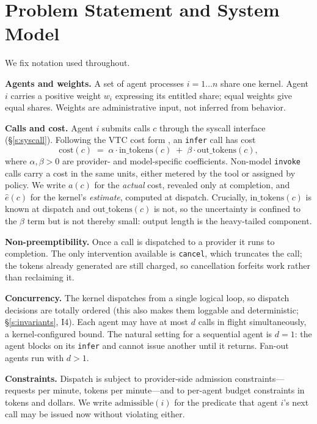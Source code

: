 \documentclass[letterpaper,11pt,leqno]{article}
\begin{document}
\section{Problem Statement and System Model}\label{s:model}

We fix notation used throughout.

\textbf{Agents and weights.} A set of agent processes $i = 1 \ldots n$ share one kernel. Agent $i$ carries a positive weight $w_i$ expressing its entitled share; equal weights give equal shares. Weights are administrative input, not inferred from behavior.

\textbf{Calls and cost.} Agent $i$ submits calls $c$ through the syscall interface (\S\ref{s:syscall}). Following the VTC cost form \citep{Sheng24}, an \texttt{infer} call has cost
\[
  \mathrm{cost}(c) \;=\; \alpha \cdot \mathrm{in\_tokens}(c) \;+\; \beta \cdot \mathrm{out\_tokens}(c),
\]
where $\alpha, \beta > 0$ are provider- and model-specific coefficients. Non-model \texttt{invoke} calls carry a cost in the same units, either metered by the tool or assigned by policy. We write $a(c)$ for the \emph{actual} cost, revealed only at completion, and $\hat{e}(c)$ for the kernel's \emph{estimate}, computed at dispatch. Crucially, $\mathrm{in\_tokens}(c)$ is known at dispatch and $\mathrm{out\_tokens}(c)$ is not, so the uncertainty is confined to the $\beta$ term but is not thereby small: output length is the heavy-tailed component.

\textbf{Non-preemptibility.} Once a call is dispatched to a provider it runs to completion. The only intervention available is \texttt{cancel}, which truncates the call; the tokens already generated are still charged, so cancellation forfeits work rather than reclaiming it.

\textbf{Concurrency.} The kernel dispatches from a single logical loop, so dispatch decisions are totally ordered (this also makes them loggable and deterministic; \S\ref{s:invariants}, I4). Each agent may have at most $d$ calls in flight simultaneously, a kernel-configured bound. The natural setting for a sequential agent is $d = 1$: the agent blocks on its \texttt{infer} and cannot issue another until it returns. Fan-out agents run with $d > 1$.

\textbf{Constraints.} Dispatch is subject to provider-side admission constraints---requests per minute, tokens per minute---and to per-agent budget constraints in tokens and dollars. We write $\mathrm{admissible}(i)$ for the predicate that agent $i$'s next call may be issued now without violating either.
\end{document}
